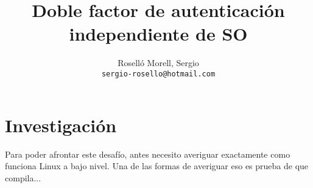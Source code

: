 \documentclass[titlepage]{article}
\title{Doble factor de autenticación independiente de SO}
\author{Roselló Morell, Sergio\\
\texttt{sergio-rosello@hotmail.com}}
\begin{document}
\maketitle
\tableofcontents
\clearpage

\section{Investigación}
\cite{codecoffee}
\cite{DBus}
Para poder afrontar este desafío, antes necesito averiguar exactamente como funciona Linux a bajo nivel. Una de las formas de averiguar eso es prueba de que compila...
\cite{dbus-send}
\printbibliography[heading=bibintoc,title={Bibliografía}]
\end{document}
